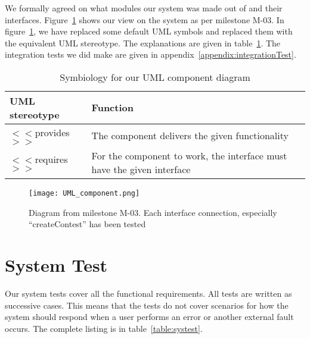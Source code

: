 We formally agreed on what modules our system was made out of and their
interfaces. Figure~\ref{fig:componentDiagram} shows our view on the system as
per milestone M-03. In figure~\ref{fig:componentDiagram}, we have replaced
some default UML symbols and replaced them with the equivalent UML stereotype.
The explanations are given in table~\ref{table:component}. The integration
tests we did make are given in appendix~\ref{appendix:integrationTest}.

\begin{longtable}{|l|p{}|}
    \caption{Symbiology for our UML component diagram} \label{table:component} \\
    \hline
    \textbf{UML stereotype} & \textbf{Function}\\
    \hline

    $<<$provides$>>$ & The component delivers the given functionality \\
    \hline

    $<<$requires$>>$& For the component to work, the interface must have the given interface\\
        \hline
\end{longtable}

\begin{figure}[h!]
    \centering
    \texttt{[image: UML\_component.png]} 
    \caption{Diagram from milestone M-03. Each interface connection,
            especially ``createContest'' has been tested}
        \label{fig:componentDiagram}
\end{figure}

\section{System Test}
Our system tests cover all the functional requirements. All tests are
written as successive cases. This means that the tests do not cover
scenarios for how the system should respond when a user performs an
error or another external fault occurs. The complete listing is in
table~\ref{table:systest}.

